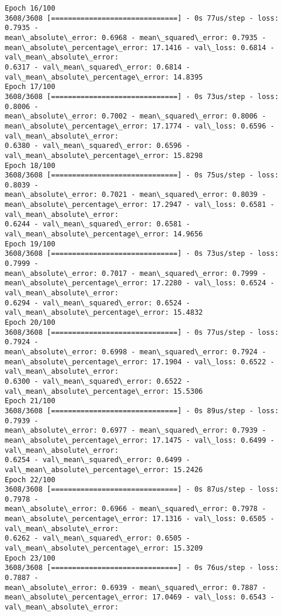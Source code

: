 \documentclass[11pt]{article}
\begin{document}
\begin{Verbatim}[commandchars=\\\{\},fontsize=\footnotesize]
Epoch 16/100
3608/3608 [==============================] - 0s 77us/step - loss: 0.7935 -
mean\_absolute\_error: 0.6968 - mean\_squared\_error: 0.7935 -
mean\_absolute\_percentage\_error: 17.1416 - val\_loss: 0.6814 - val\_mean\_absolute\_error:
0.6317 - val\_mean\_squared\_error: 0.6814 - val\_mean\_absolute\_percentage\_error: 14.8395
Epoch 17/100
3608/3608 [==============================] - 0s 73us/step - loss: 0.8006 -
mean\_absolute\_error: 0.7002 - mean\_squared\_error: 0.8006 -
mean\_absolute\_percentage\_error: 17.1774 - val\_loss: 0.6596 - val\_mean\_absolute\_error:
0.6380 - val\_mean\_squared\_error: 0.6596 - val\_mean\_absolute\_percentage\_error: 15.8298
Epoch 18/100
3608/3608 [==============================] - 0s 75us/step - loss: 0.8039 -
mean\_absolute\_error: 0.7021 - mean\_squared\_error: 0.8039 -
mean\_absolute\_percentage\_error: 17.2947 - val\_loss: 0.6581 - val\_mean\_absolute\_error:
0.6244 - val\_mean\_squared\_error: 0.6581 - val\_mean\_absolute\_percentage\_error: 14.9656
Epoch 19/100
3608/3608 [==============================] - 0s 73us/step - loss: 0.7999 -
mean\_absolute\_error: 0.7017 - mean\_squared\_error: 0.7999 -
mean\_absolute\_percentage\_error: 17.2280 - val\_loss: 0.6524 - val\_mean\_absolute\_error:
0.6294 - val\_mean\_squared\_error: 0.6524 - val\_mean\_absolute\_percentage\_error: 15.4832
Epoch 20/100
3608/3608 [==============================] - 0s 77us/step - loss: 0.7924 -
mean\_absolute\_error: 0.6998 - mean\_squared\_error: 0.7924 -
mean\_absolute\_percentage\_error: 17.1904 - val\_loss: 0.6522 - val\_mean\_absolute\_error:
0.6300 - val\_mean\_squared\_error: 0.6522 - val\_mean\_absolute\_percentage\_error: 15.5306
Epoch 21/100
3608/3608 [==============================] - 0s 89us/step - loss: 0.7939 -
mean\_absolute\_error: 0.6977 - mean\_squared\_error: 0.7939 -
mean\_absolute\_percentage\_error: 17.1475 - val\_loss: 0.6499 - val\_mean\_absolute\_error:
0.6254 - val\_mean\_squared\_error: 0.6499 - val\_mean\_absolute\_percentage\_error: 15.2426
Epoch 22/100
3608/3608 [==============================] - 0s 87us/step - loss: 0.7978 -
mean\_absolute\_error: 0.6966 - mean\_squared\_error: 0.7978 -
mean\_absolute\_percentage\_error: 17.1316 - val\_loss: 0.6505 - val\_mean\_absolute\_error:
0.6262 - val\_mean\_squared\_error: 0.6505 - val\_mean\_absolute\_percentage\_error: 15.3209
Epoch 23/100
3608/3608 [==============================] - 0s 76us/step - loss: 0.7887 -
mean\_absolute\_error: 0.6939 - mean\_squared\_error: 0.7887 -
mean\_absolute\_percentage\_error: 17.0469 - val\_loss: 0.6543 - val\_mean\_absolute\_error:

\end{Verbatim}
\end{document}
